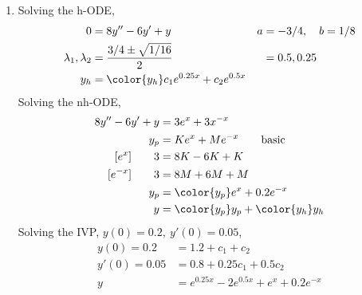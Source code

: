 \begin{enumerate}
    \item Solving the h-ODE,
          \begin{align}
              0                        & = 8y'' - 6y' + y                             & a & = -3/4, \quad b = 1/8 \\
              \lambda_{1}, \lambda_{2} & = \frac{3/4 \pm \sqrt{1/16}}{2}              &   & = 0.5, 0.25           \\
              y_{h}                    & = \color{y_h} c_{1}e^{0.25x} + c_{2}e^{0.5x}
          \end{align}
          Solving the nh-ODE,
          \begin{align}
              8y'' - 6y' + y    & = 3e^{x} + 3x^{-x}                          \\
              y_{p}             & = Ke^{x} + Me^{-x} \qquad \text{basic}      \\
              [e^{x}] \qquad 3  & = 8K - 6K + K                               \\
              [e^{-x}] \qquad 3 & = 8M + 6M + M                               \\
              y_{p}             & = \color{y_p} e^{x} + 0.2e^{-x}             \\
              y                 & = {\color{y_p} y_{p}} + {\color{y_h} y_{h}}
          \end{align}
          Solving the IVP, $ y(0) = 0.2,\ y'(0) = 0.05 $,
          \begin{align}
              y(0) = 0.2   & = 1.2 + c_{1} + c_{2}                       \\
              y'(0) = 0.05 & = 0.8 + 0.25c_{1} + 0.5c_{2}                \\
              y            & = e^{0.25x} - 2e^{0.5x} + e^{x} + 0.2e^{-x}
          \end{align}


\end{enumerate}
